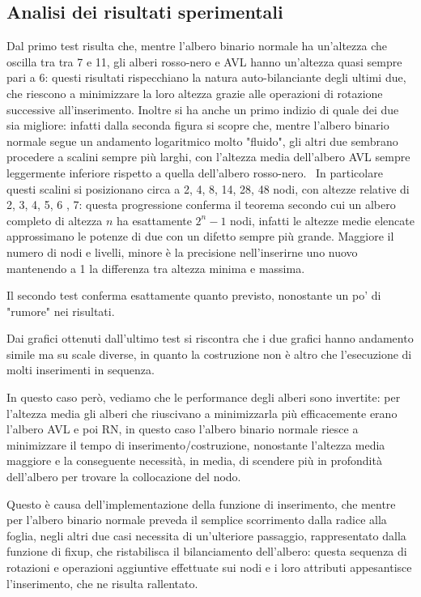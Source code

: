 \documentclass[a4paper,12pt]{article}
\begin{document}
    \subsection{Analisi dei risultati sperimentali}
    Dal primo test risulta che, mentre l'albero binario normale ha un'altezza che oscilla tra tra 7 e 11, gli
    alberi rosso-nero e AVL hanno un'altezza quasi sempre pari a 6: questi risultati rispecchiano la natura
    auto-bilanciante degli ultimi due, che riescono a minimizzare la loro altezza grazie alle operazioni di rotazione
    successive all'inserimento.
    Inoltre si ha anche un primo indizio di quale dei due sia migliore: infatti dalla seconda figura si scopre che,
    mentre l'albero binario normale segue un andamento logaritmico molto "fluido", gli altri due sembrano procedere a
    scalini sempre più larghi, con l'altezza media dell'albero AVL sempre leggermente inferiore rispetto a quella
    dell'albero rosso-nero.
    \
    In particolare questi scalini si posizionano circa a 2, 4, 8, 14, 28, 48 nodi, con altezze relative di 2, 3, 4, 5, 6
    , 7: questa progressione conferma il teorema secondo cui un albero completo di altezza $n$ ha esattamente $2^n-1$
    nodi, infatti le altezze medie elencate approssimano le potenze di due con un difetto sempre più grande.
    Maggiore il numero di nodi e livelli, minore è la precisione nell'inserirne uno nuovo mantenendo a 1 la
    differenza tra altezza minima e massima.
    \vspace{\baselineskip}

    Il secondo test conferma esattamente quanto previsto, nonostante un po' di "rumore" nei risultati.
    \vspace{\baselineskip}

    Dai grafici ottenuti dall'ultimo test si riscontra che i due grafici hanno andamento simile ma su scale diverse, in
    quanto la costruzione non è altro che l'esecuzione di molti inserimenti in sequenza.

    In questo caso però, vediamo che le performance degli alberi sono invertite: per l'altezza media gli alberi
    che riuscivano a minimizzarla più efficacemente erano l'albero AVL e poi RN, in questo caso l'albero binario
    normale riesce a minimizzare il tempo di inserimento/costruzione, nonostante l'altezza media maggiore e la
    conseguente necessità, in media, di scendere più in profondità dell'albero per trovare la collocazione del nodo.

    Questo è causa dell'implementazione della funzione di inserimento, che mentre per l'albero binario normale
    preveda il semplice scorrimento dalla radice alla foglia, negli altri due casi necessita di un'ulteriore
    passaggio, rappresentato dalla funzione di fixup, che ristabilisca il bilanciamento dell'albero: questa sequenza
    di rotazioni e operazioni aggiuntive effettuate sui nodi e i loro attributi appesantisce l'inserimento, che ne
    risulta rallentato.
\end{document}
